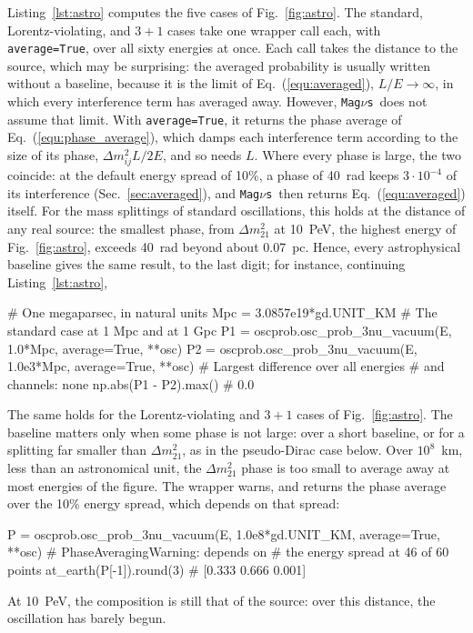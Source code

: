 \documentclass[final,5p,times,twocolumn,sort,compress]{elsarticle}
\makeatletter
\newcommand{\eq}{Eq.}
\newcommand{\fig}{Fig.}
\DeclareRobustCommand{\_}{%
  \ifmmode\nfss@text{\textunderscore}\else\textunderscore\allowbreak\fi}
\newcommand{\equ}[1]{\eq~(\ref{equ:#1})}
\newcommand{\figu}[1]{\fig~\ref{fig:#1}}
\newcommand{\magnus}{{\tt Mag}\ensuremath{\nu}{\tt s}}
\makeatother
\begin{document}
Listing~\ref{lst:astro} computes the five cases of \figu{astro}. The standard, Lorentz-violating, and $3+1$ cases take one wrapper call each, with {\tt average=True}, over all sixty energies at once. Each call takes the distance to the source, which may be surprising: the averaged probability is usually written without a baseline, because it is the limit of \equ{averaged}, $L/E \to \infty$, in which every interference term has averaged away. However, \magnus\ does not assume that limit. With {\tt average=True}, it returns the phase average of \equ{phase_average}, which damps each interference term according to the size of its phase, $\Delta m^2_{ij} L/2E$, and so needs $L$. Where every phase is large, the two coincide: at the default energy spread of 10\%, a phase of 40~rad keeps $3 \cdot 10^{-4}$ of its interference (Sec.~\ref{sec:averaged}), and \magnus\ then returns \equ{averaged} itself. For the mass splittings of standard oscillations, this holds at the distance of any real source: the smallest phase, from $\Delta m^2_{21}$ at 10~PeV, the highest energy of \figu{astro}, exceeds 40~rad beyond about 0.07~pc. Hence, every astrophysical baseline gives the same result, to the last digit; for instance, continuing Listing~\ref{lst:astro},
\begin{pysnip}
# One megaparsec, in natural units
Mpc = 3.0857e19*gd.UNIT_KM
# The standard case at 1 Mpc and at 1 Gpc
P1 = oscprob.osc_prob_3nu_vacuum(E,
 1.0*Mpc, average=True, **osc)
P2 = oscprob.osc_prob_3nu_vacuum(E,
 1.0e3*Mpc, average=True, **osc)
# Largest difference over all energies
# and channels: none
np.abs(P1 - P2).max()        # 0.0
\end{pysnip}
The same holds for the Lorentz-violating and $3+1$ cases of \figu{astro}. The baseline matters only when some phase is not large: over a short baseline, or for a splitting far smaller than $\Delta m^2_{21}$, as in the pseudo-Dirac case below. Over $10^8$~km, less than an astronomical unit, the $\Delta m^2_{21}$ phase is too small to average away at most energies of the figure. The wrapper warns, and returns the phase average over the 10\% energy spread, which depends on that spread:
\begin{pysnip}
P = oscprob.osc_prob_3nu_vacuum(E,
 1.0e8*gd.UNIT_KM, average=True, **osc)
# PhaseAveragingWarning: depends on
# the energy spread at 46 of 60 points
at_earth(P[-1]).round(3)
# [0.333 0.666 0.001]
\end{pysnip}
At 10~PeV, the composition is still that of the source: over this distance, the oscillation has barely begun.
\end{document}
